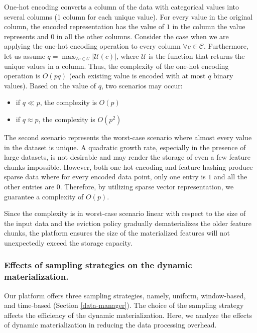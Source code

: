 One-hot encoding converts a column of the data with categorical values into several columns (1 column for each unique value).
For every value in the original column, the encoded representation has the value of $1$ in the column the value represents and $0$ in all the other columns.
Consider the case when we are applying the one-hot encoding operation to every column $\forall c \in \mathcal{C}$.
Furthermore, let us assume $q = \max_{\forall c \in \mathcal{C}} |\mathcal{U}(c)|$, where $\mathcal{U}$ is the function that returns the unique values in a column.
Thus, the complexity of the one-hot encoding operation is $O(pq)$ (each existing value is encoded with at most $q$ binary values).
Based on the value of $q$, two scenarios may occur:
\begin{itemize}
\item if $q \ll p$, the complexity is $O(p)$
\item if $q \approx p$, the complexity is  $O(p^2)$
\end{itemize}
The second scenario represents the worst-case scenario where almost every value in the dataset is unique.
A quadratic growth rate, especially in the presence of large datasets, is not desirable and may render the storage of even a few feature chunks impossible.
However, both one-hot encoding and feature hashing produce sparse data where for every encoded data point, only one entry is $1$ and all the other entries are $0$.
Therefore, by utilizing sparse vector representation, we guarantee a complexity of $O(p)$.

Since the complexity is in worst-case scenario linear with respect to the size of the input data and the eviction policy gradually dematerializes the older feature chunks, the platform ensures the size of the materialized features will not unexpectedly exceed the storage capacity.

\subsubsection{Effects of sampling strategies on the dynamic materialization.}
Our platform offers three sampling strategies, namely, uniform, window-based, and time-based (Section \ref{data-manager}).
The choice of the sampling strategy affects the efficiency of the dynamic materialization.
Here, we analyze the effects of dynamic materialization in reducing the data processing overhead.

